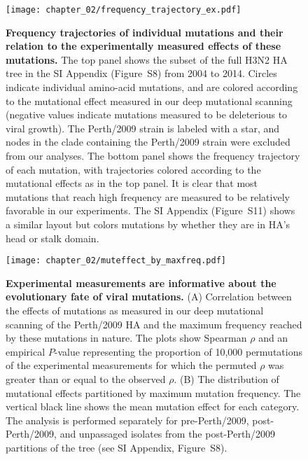 \begin{figure}
  \centering
  \texttt{[image: chapter\_02/frequency\_trajectory\_ex.pdf]}
  \caption{\label{fig:frequency_trajectory}
    {\bf Frequency trajectories of individual mutations and their relation to the experimentally measured effects of these mutations.}
    The top panel shows the subset of the full H3N2 HA tree in the SI Appendix (Figure~S8) from 2004 to 2014.
    Circles indicate individual amino-acid mutations, and are colored according to the mutational effect measured in our deep mutational scanning (negative values indicate mutations measured to be deleterious to viral growth).
    The Perth/2009 strain is labeled with a star, and nodes in the clade containing the Perth/2009 strain were excluded from our analyses.
    The bottom panel shows the frequency trajectory of each mutation, with trajectories colored according to the mutational effects as in the top panel.
    It is clear that most mutations that reach high frequency are measured to be relatively favorable in our experiments.
    The SI Appendix (Figure~S11) shows a similar layout but colors mutations by whether they are in HA's head or stalk domain.
}
\end{figure}

\begin{figure}
  \centering
  \texttt{[image: chapter\_02/muteffect\_by\_maxfreq.pdf]}
  \caption{\label{fig:muteffect_maxfreq}
    {\bf Experimental measurements are informative about the evolutionary fate of viral mutations.}
    (A) Correlation between the effects of mutations as measured in our deep mutational scanning of the Perth/2009 HA and the maximum frequency reached by these mutations in nature.
    The plots show Spearman $\rho$ and an empirical $P$-value representing the proportion of 10,000 permutations of the experimental measurements for which the permuted $\rho$ was greater than or equal to the observed $\rho$.
    (B) The distribution of mutational effects partitioned by maximum mutation frequency.
    The vertical black line shows the mean mutation effect for each category.
    The analysis is performed separately for pre-Perth/2009, post-Perth/2009, and unpassaged isolates from the post-Perth/2009 partitions of the tree (see SI Appendix, Figure~S8).
}
\end{figure}

